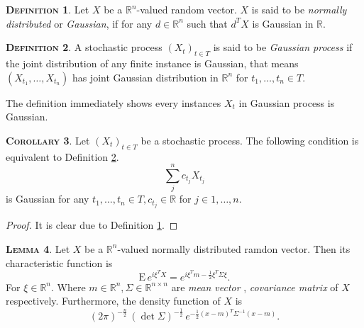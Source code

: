 \documentclass[a4paper, twoside, 11pt]{article}
\theoremstyle{definition}
\newtheorem{definition}{\scshape Definition}[section]
\newtheorem{lemma}[definition]{\scshape Lemma}
\newtheorem{corollary}[definition]{\scshape Corollary}
\begin{document}
\begin{definition}
  Let $X$ be a $\mathbb{R}^{n}$-valued random vector. $X$ is said to be \emph{normally distributed} or \emph{Gaussian}, if for any $d \in \mathbb{R}^{n}$ such that $d^TX$ is Gaussian in $\mathbb{R}$.
  \label{sec:g1}
\end{definition}

\begin{definition}
  A stochastic process $(X_t)_{t\in T}$ is said to be \emph{Gaussian process} if the joint distribution of any finite instance is Gaussian, that means
$
(X_{t_1},\dots, X_{t_n})
$ has joint Gaussian distribution in $\mathbb{R}^n$ for $t_1,\dots,t_n \in T$.
\label{sec:defgau}
\end{definition}
The definition immediately shows every instances $X_t$ in Gaussian process is Gaussian.

\begin{corollary}
  Let $(X_t)_{t\in T}$ be a stochastic process. The following condition is \\equivalent to Definition \ref{sec:defgau}.
  \begin{equation*}
	\sum_j^n c_{t_j} X_{t_j}
  \end{equation*}
  is Gaussian for any $t_1,\dots,t_n \in T, c_{t_j} \in \mathbb{R}$ for $j\in {1,\dots,n}$.
  \label{sec:gauss}
\end{corollary}
\begin{proof}
  It is clear due to Definition \ref{sec:g1}.
\end{proof}

\begin{lemma}
  Let $X$ be a $\mathbb{R}^{n}$-valued normally distributed ramdon vector. Then its characteristic function is 
  \begin{equation}
	\mathrm{E}\,e^{i\xi^TX} = e^{i\xi^Tm - \frac{1}{2}\xi^T \Sigma \xi}.
	\label{sec:mcf}
  \end{equation}
 For $\xi \in \mathbb{R}^{n}$. Where $m \in \mathbb{R}^{n}, \Sigma \in \mathbb{R}^{n\times n}$ are \emph{mean vector} , \emph{covariance matrix} of $X$ \\respectively. Furthermore, the density function of $X$ is
\begin{equation}
  (2\pi)^{-\frac{n}{2}}\, (\det\Sigma) ^{-\frac{1}{2}}\,e^{-\frac{1}{2}(x-m)^T\Sigma^{-1}(x-m)}.
  \label{sec:dsy}
\end{equation}
\end{lemma}
\end{document}
